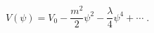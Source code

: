 \begin{equation}
\label{eq:maximum}
V(\psi) = V_0 -\frac{m^2}{2} \psi^2 -\frac{\lambda}{4} \psi^4 + \cdots \;.
\end{equation} 
